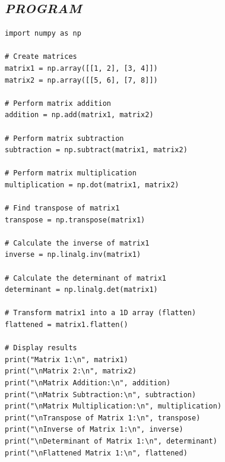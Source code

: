 \documentclass[11pt,a4paper]{article}
\begin{document}
\subsection*{\textit{PROGRAM}}
\begin{lstlisting}[style=pythonstyle]
import numpy as np 
 
# Create matrices 
matrix1 = np.array([[1, 2], [3, 4]]) 
matrix2 = np.array([[5, 6], [7, 8]]) 
 
# Perform matrix addition 
addition = np.add(matrix1, matrix2) 
 
# Perform matrix subtraction 
subtraction = np.subtract(matrix1, matrix2) 
 
# Perform matrix multiplication 
multiplication = np.dot(matrix1, matrix2) 
 
# Find transpose of matrix1 
transpose = np.transpose(matrix1) 
 
# Calculate the inverse of matrix1 
inverse = np.linalg.inv(matrix1) 
 
# Calculate the determinant of matrix1 
determinant = np.linalg.det(matrix1) 
 
# Transform matrix1 into a 1D array (flatten) 
flattened = matrix1.flatten() 
 
# Display results 
print("Matrix 1:\n", matrix1) 
print("\nMatrix 2:\n", matrix2) 
print("\nMatrix Addition:\n", addition) 
print("\nMatrix Subtraction:\n", subtraction) 
print("\nMatrix Multiplication:\n", multiplication) 
print("\nTranspose of Matrix 1:\n", transpose) 
print("\nInverse of Matrix 1:\n", inverse) 
print("\nDeterminant of Matrix 1:\n", determinant) 
print("\nFlattened Matrix 1:\n", flattened)
\end{lstlisting}
\end{document}
